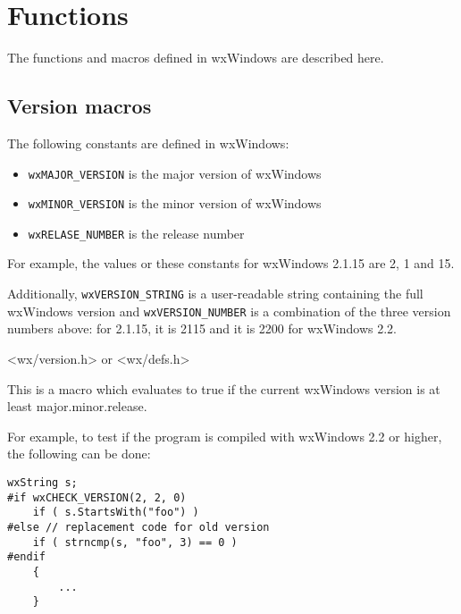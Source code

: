 \chapter{Functions}\label{functions}
%
\setfooter{\thepage}{}{}{}{}{\thepage}

The functions and macros defined in wxWindows are described here.

\section{Version macros}\label{versionfunctions}

The following constants are defined in wxWindows:

\begin{itemize}\itemsep=0pt
\item {\tt wxMAJOR\_VERSION} is the major version of wxWindows
\item {\tt wxMINOR\_VERSION} is the minor version of wxWindows
\item {\tt wxRELASE\_NUMBER} is the release number
\end{itemize}

For example, the values or these constants for wxWindows 2.1.15 are 2, 1 and
15.

Additionally, {\tt wxVERSION\_STRING} is a user-readable string containing
the full wxWindows version and {\tt wxVERSION\_NUMBER} is a combination of the
three version numbers above: for 2.1.15, it is 2115 and it is 2200 for
wxWindows 2.2.


<wx/version.h> or <wx/defs.h>

\label{wxcheckversion}


This is a macro which evaluates to true if the current wxWindows version is at
least major.minor.release.

For example, to test if the program is compiled with wxWindows 2.2 or higher,
the following can be done:

\begin{verbatim}
wxString s;
#if wxCHECK_VERSION(2, 2, 0)
    if ( s.StartsWith("foo") )
#else // replacement code for old version
    if ( strncmp(s, "foo", 3) == 0 )
#endif
    {
        ...
    }
\end{verbatim}

